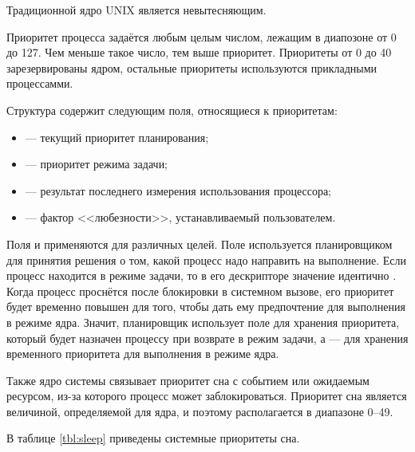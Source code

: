 Традиционной ядро UNIX является невытесняющим.

Приоритет процесса задаётся любым целым числом, лежащим в 
диапозоне от 0 до 127. Чем меньше такое число, тем выше приоритет.
Приоритеты от 0 до 40 зарезервированы ядром, остальные приоритеты 
используются прикладными процессамми.

Структура  содержит следующим поля, относящиеся к приоритетам:
\begin{itemize}
  \item {} --- текущий приоритет планирования;
  \item {} --- приоритет режима задачи;
  \item {} --- результат последнего измерения использования процессора;
  \item {} --- фактор <<любезности>>, устанавливаемый пользователем.
\end{itemize}

Поля  и  применяются для различных целей.
Поле  используется планировщиком для принятия решения о том,
какой процесс надо направить на выполнение. Если процесс находится в режиме задачи,
то в его дескрипторе значение  идентично .
Когда процесс проснётся после
блокировки в системном вызове, его приоритет будет временно повышен для того,
чтобы дать ему предпочтение для выполнения в режиме ядра. Значит,
планировщик использует поле  для хранения приоритета, который
будет назначен процессу при возврате в режим задачи, а  --- для 
хранения временного приоритета для выполнения в режиме ядра.

Также ядро системы связывает приоритет сна с событием или ожидаемым
ресурсом, из-за которого процесс может заблокироваться. Приоритет сна
является величиной, определяемой для ядра, и поэтому располагается в 
диапазоне 0--49. 

В таблице \ref{tbl:sleep} приведены системные приоритеты сна.


